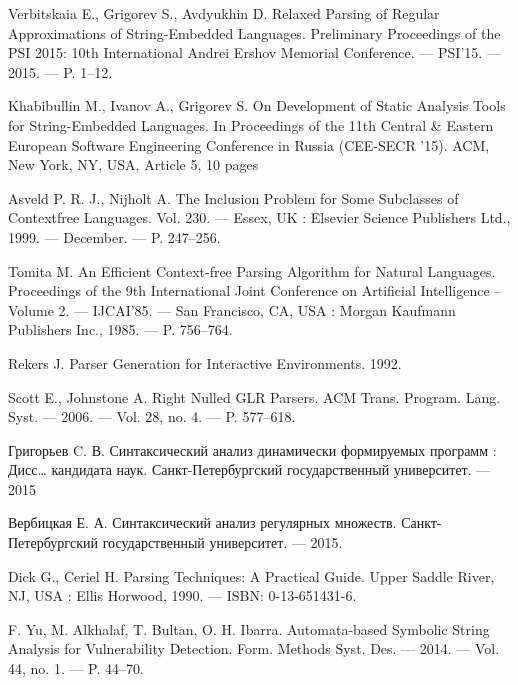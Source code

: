 \begin{thebibliography}{99}
  Verbitskaia E., Grigorev S., Avdyukhin D. 
  Relaxed Parsing of Regular Approximations of String-Embedded Languages. 
  Preliminary Proceedings of the PSI 2015: 10th International Andrei Ershov Memorial Conference. –– PSI’15. –– 2015. –– P. 1–12.

  Khabibullin M., Ivanov A., Grigorev S.
  On Development of Static Analysis Tools for String-Embedded Languages.
  In Proceedings of the 11th Central \& Eastern European Software Engineering Conference in Russia (CEE-SECR '15). ACM, New York, NY, USA, Article 5, 10 pages
                      
  Asveld P. R. J., Nijholt A.
  The Inclusion Problem for Some Subclasses of Contextfree Languages. 
  Vol. 230. –– Essex, UK : Elsevier Science Publishers Ltd., 1999. –– December. –– P. 247–256.

  Tomita M.
  An Efficient Context-free Parsing Algorithm for Natural Languages.
  Proceedings of the 9th International Joint Conference on Artificial Intelligence -- Volume 2. –– IJCAI’85. –– San Francisco, CA, USA : Morgan Kaufmann Publishers Inc., 1985. –– P. 756–764.

  Rekers J.
  Parser Generation for Interactive Environments. 
  1992.

  Scott E., Johnstone A. 
  Right Nulled GLR Parsers.
  ACM Trans. Program. Lang. Syst. –– 2006. –– Vol. 28, no. 4. –– P. 577–618.

  Григорьев C. В.
  Синтаксический анализ динамически формируемых программ : Дисс… кандидата наук.
  Санкт-Петербургский государственный университет. –– 2015 

  Вербицкая Е. А. 
  Синтаксический анализ регулярных множеств.
  Санкт-Петербургский государственный университет. –– 2015.

  Dick G., Ceriel H. 
  Parsing Techniques: A Practical Guide.
  Upper Saddle River, NJ, USA : Ellis Horwood, 1990. –– ISBN: 0-13-651431-6.

  F. Yu, M. Alkhalaf, T. Bultan, O. H. Ibarra.
  Automata-based Symbolic String Analysis for Vulnerability Detection. 
  Form. Methods Syst. Des. –– 2014. –– Vol. 44, no. 1. –– P. 44–70.
\end{thebibliography}
